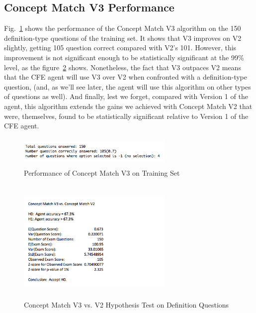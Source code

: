 \subsection{Concept Match V3 Performance}

Fig.~\ref{fig:concept_match_v3_training_set_performance} shows the performance of the Concept Match V3 algorithm on the 150 definition-type questions of the training set.  It shows that V3 improves on V2 slightly, getting 105 question correct compared with V2's 101.  However, this improvement is not significant enough to be statistically significant at the 99\% level, as the figure~\ref{fig:concept_match_v3_hypothesis_test} shows.  Nonetheless, the fact that V3 outpaces V2 means that the CFE agent will use V3 over V2 when confronted with a definition-type question, (and, as we'll see later, the agent will use this algorithm on other types of questions as well).  And finally, lest we forget, compared with Version 1 of the agent, this algorithm extends the gains we achieved with Concept Match V2 that were, themselves, found to be statistically significant relative to Version 1 of the CFE agent.

\begin{figure}
\centering
\vspace{0.75in}
\includegraphics[width=75mm, height=15mm]{concept_match_v3_training_set_performance.png}
\caption{Performance of Concept Match V3 on Training Set}
\label{fig:concept_match_v3_training_set_performance}
\end{figure}



\begin{figure}
\centering
\vspace{0.75in}
\includegraphics[width=75mm, height=60mm]{concept_match_v3_hypothesis_test.png}
\caption{Concept Match V3 vs. V2 Hypothesis Test on Definition Questions}
\label{fig:concept_match_v3_hypothesis_test}
\end{figure}



